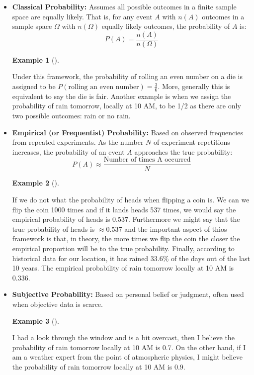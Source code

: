 \documentclass[
  letterpaper,
  DIV=11,
  numbers=noendperiod]{scrreport}
\theoremstyle{definition}
\newtheorem{example}{Example}[chapter]
\theoremstyle{plain}
\theoremstyle{definition}
\theoremstyle{plain}
\theoremstyle{remark}
\begin{document}
\begin{itemize}
\item
  \textbf{Classical Probability:} Assumes all possible outcomes in a
  finite sample space are equally likely. That is, for any event \(A\)
  with \(n(A)\) outcomes in a sample space \(\Omega\) with \(n(\Omega)\)
  equally likely outcomes, the probability of \(A\) is:
  \[ P(A) = \frac{n(A)}{n(\Omega)} \]

  \begin{example}[]\protect\hypertarget{exm-classical-prob}{}\label{exm-classical-prob}

  Under this framework, the probability of rolling an even number on a
  die is assigned to be
  \(P(\text{rolling an even number}) = \frac{3}{6}\). More, generally
  this is equivalent to say the die is fair. Another example is when we
  assign the probability of rain tomorrow, locally at 10 AM, to be 1/2
  as there are only two possible outcomes: rain or no rain.

  \end{example}
\item
  \textbf{Empirical (or Frequentist) Probability:} Based on observed
  frequencies from repeated experiments. As the number \(N\) of
  experiment repetitions increases, the probability of an event \(A\)
  approaches the true probability:
  \[ P(A) \approx \frac{\text{Number of times A occurred}}{N} \]

  \begin{example}[]\protect\hypertarget{exm-frequentist-prob}{}\label{exm-frequentist-prob}

  If we do not what the probability of heads when flipping a coin is. We
  can we flip the coin 1000 times and if it lands heads 537 times, we
  would say the empirical probability of heads is \(0.537\). Furthermore
  we might say that the true probability of heads is \(\approx 0.537\)
  and the important aspect of thios framework is that, in theory, the
  more times we flip the coin the closer the empirical proportion will
  be to the true probability. Finally, according to historical data for
  our location, it has rained 33.6\% of the days out of the last 10
  years. The empirical probability of rain tomorrow locally at 10 AM is
  0.336.

  \end{example}
\item
  \textbf{Subjective Probability:} Based on personal belief or judgment,
  often used when objective data is scarce.

  \begin{example}[]\protect\hypertarget{exm-subjective-prob}{}\label{exm-subjective-prob}

  I had a look through the window and is a bit overcast, then I believe
  the probability of rain tomorrow locally at 10 AM is 0.7. On the other
  hand, if I am a weather expert from the point of atmospheric physics,
  I might believe the probability of rain tomorrow locally at 10 AM is
  0.9.

  \end{example}
\end{itemize}
\end{document}
